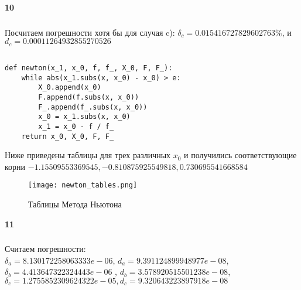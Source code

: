 \documentclass[a4paper,12pt]{article}
\begin{document}
\begin{center}
{\bf10}\\
\vspace{0.5cm}
\end{center}
\setcounter{page}{10}


\subsubsection{}
Посчитаем погрешности хотя бы для случая c):
$\delta_c = 0.015416727829602763 \%$, и $d_c = 0.00011264932855270526$

\subsection{}

\begin{lstlisting}
def newton(x_1, x_0, f, f_, X_0, F, F_):
    while abs(x_1.subs(x, x_0) - x_0) > e:
        X_0.append(x_0)
        F.append(f.subs(x, x_0))
        F_.append(f_.subs(x, x_0))
        x_0 = x_1.subs(x, x_0)
        x_1 = x_0 - f / f_
    return x_0, X_0, F, F_
\end{lstlisting}
Ниже приведены таблицы для трех различных $x_0$ и получились соответствующие корни $-1.15509553369545, -0.810875925549818, 0.730695541668584$
\begin{figure}[h]
    \centering
    \texttt{[image: newton\_tables.png]}
    \caption{Таблицы Метода Ньютона}
    \label{newton_tables_graph}
\end{figure}

\newpage
\begin{center}
{\bf11}\\
\vspace{0.5cm}
\end{center}
\setcounter{page}{11}
\subsubsection{}
Считаем погрешности: \\
$\delta_a = 8.130172258063333e-06$, $d_a = 9.391124899948977e-08$, $\delta_b = 4.413647322324443e-06$ , $d_b = 3.578920515501238e-08$, $\delta_c = 1.2755852309624322e-05, d_c = 9.320643223897918e-08$
\end{document}
